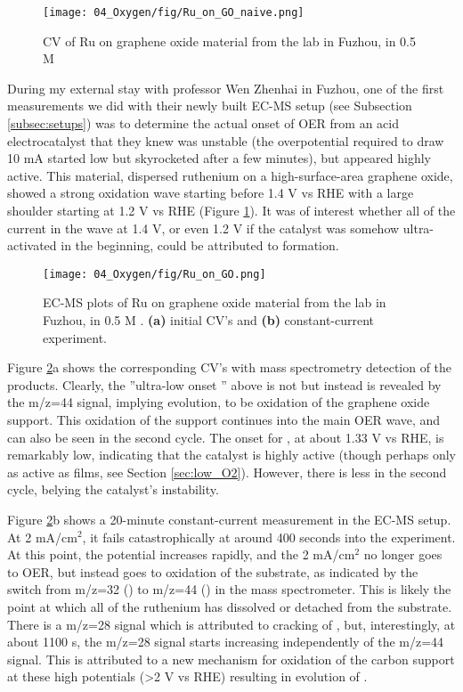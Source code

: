 \begin{figure}[h]
	\centering
	\texttt{[image: 04\_Oxygen/fig/Ru\_on\_GO\_naive.png]}
	\caption{CV of Ru on graphene oxide material from the lab in Fuzhou, in 0.5 M }
	\label{fig:Ru_on_GO_naive}
\end{figure}

During my external stay with professor Wen Zhenhai in Fuzhou, one of the first measurements we did with their newly built EC-MS setup (see Subsection \ref{subsec:setups}) was to determine the actual onset of OER from an acid electrocatalyst that they knew was unstable (the overpotential required to draw 10 mA started low but skyrocketed after a few minutes), but appeared highly active. This material, dispersed ruthenium on a high-surface-area graphene oxide, showed a strong oxidation wave starting before 1.4 V vs RHE with a large shoulder starting at 1.2 V vs RHE (Figure \ref{fig:Ru_on_GO_naive}). It was of interest whether all of the current in the wave at 1.4 V, or even 1.2 V if the catalyst was somehow ultra-activated in the beginning, could be attributed to  formation.

\begin{figure}[h]
	\centering
	\texttt{[image: 04\_Oxygen/fig/Ru\_on\_GO.png]}
	\caption{EC-MS plots of Ru on graphene oxide material from the lab in Fuzhou, in 0.5 M . \textbf{(a)} initial CV's and \textbf{(b)} constant-current experiment.}
	\label{fig:Ru_on_GO}
\end{figure}

Figure \ref{fig:Ru_on_GO}a shows the corresponding CV's with mass spectrometry detection of the products. Clearly, the ''ultra-low onset '' above is not  but instead is revealed by the m/z=44 signal, implying  evolution, to be oxidation of the graphene oxide support. This oxidation of the support continues into the main OER wave, and can also be seen in the second cycle. The onset for , at about 1.33 V vs RHE, is remarkably low, indicating that the catalyst is highly active (though perhaps only as active as  films, see Section \ref{sec:low_O2}). However, there is less  in the second cycle, belying the catalyst's instability.

Figure \ref{fig:Ru_on_GO}b shows a 20-minute constant-current measurement in the EC-MS setup. At 2 mA/cm$^2$, it fails catastrophically at around 400 seconds into the experiment. At this point, the potential increases rapidly, and the 2 mA/cm$^2$ no longer goes to OER, but instead goes to oxidation of the substrate, as indicated by the switch from m/z=32 () to m/z=44 () in the mass spectrometer. This is likely the point at which all of the ruthenium has dissolved or detached from the substrate. There is a m/z=28 signal which is attributed to cracking of , but, interestingly, at about 1100 s, the m/z=28 signal starts increasing independently of the m/z=44 signal. This is attributed to a new mechanism for oxidation of the carbon support at these high potentials (>2 V vs RHE) resulting in evolution of . 

